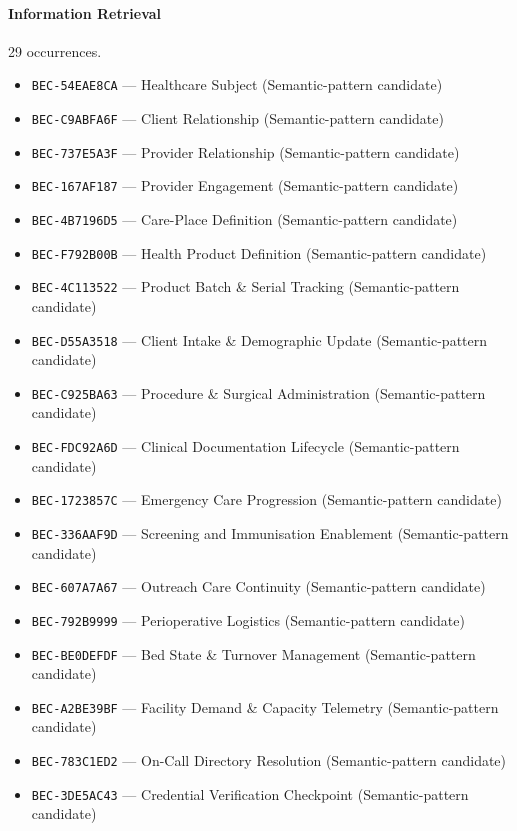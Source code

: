 \documentclass[11pt,a4paper,openany]{book}
\begin{document}
\paragraph{Information Retrieval} 29 occurrences.\par
\begin{itemize}
\item \texttt{BEC-54EAE8CA} --- Healthcare Subject (Semantic-pattern candidate)
\item \texttt{BEC-C9ABFA6F} --- Client Relationship (Semantic-pattern candidate)
\item \texttt{BEC-737E5A3F} --- Provider Relationship (Semantic-pattern candidate)
\item \texttt{BEC-167AF187} --- Provider Engagement (Semantic-pattern candidate)
\item \texttt{BEC-4B7196D5} --- Care-Place Definition (Semantic-pattern candidate)
\item \texttt{BEC-F792B00B} --- Health Product Definition (Semantic-pattern candidate)
\item \texttt{BEC-4C113522} --- Product Batch \& Serial Tracking (Semantic-pattern candidate)
\item \texttt{BEC-D55A3518} --- Client Intake \& Demographic Update (Semantic-pattern candidate)
\item \texttt{BEC-C925BA63} --- Procedure \& Surgical Administration (Semantic-pattern candidate)
\item \texttt{BEC-FDC92A6D} --- Clinical Documentation Lifecycle (Semantic-pattern candidate)
\item \texttt{BEC-1723857C} --- Emergency Care Progression (Semantic-pattern candidate)
\item \texttt{BEC-336AAF9D} --- Screening and Immunisation Enablement (Semantic-pattern candidate)
\item \texttt{BEC-607A7A67} --- Outreach Care Continuity (Semantic-pattern candidate)
\item \texttt{BEC-792B9999} --- Perioperative Logistics (Semantic-pattern candidate)
\item \texttt{BEC-BE0DEFDF} --- Bed State \& Turnover Management (Semantic-pattern candidate)
\item \texttt{BEC-A2BE39BF} --- Facility Demand \& Capacity Telemetry (Semantic-pattern candidate)
\item \texttt{BEC-783C1ED2} --- On-Call Directory Resolution (Semantic-pattern candidate)
\item \texttt{BEC-3DE5AC43} --- Credential Verification Checkpoint (Semantic-pattern candidate)

\end{itemize}
\end{document}
